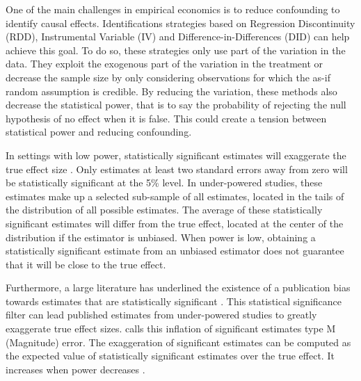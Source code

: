 \documentclass[12pt]{article}
\begin{document}



One of the main challenges in empirical economics is to reduce confounding to identify causal effects. Identifications strategies based on Regression Discontinuity (RDD), Instrumental Variable (IV) and Difference-in-Differences (DID) can help achieve this goal. To do so, these strategies only use part of the variation in the data. They exploit the exogenous part of the variation in the treatment or decrease the sample size by only considering observations for which the as-if random assumption is credible. By reducing the variation, these methods also decrease the statistical power, that is to say the probability of rejecting the null hypothesis of no effect when it is false. This could create a tension between statistical power and reducing
confounding.



In settings with low power, statistically significant estimates will exaggerate the true effect size \citep{ioannidis_why_2008, gelman_beyond_2014}. Only estimates at least two standard errors away from zero will be statistically significant at the 5\% level. In under-powered studies, these estimates make up a selected sub-sample of all estimates, located in the tails of the distribution of all possible estimates. The average of these statistically significant estimates will differ from the true effect, located at the center of the distribution if the estimator is unbiased. When power is low, obtaining a statistically significant estimate from an unbiased estimator does not guarantee that it will be close to the true effect. 

Furthermore, a large literature has underlined the existence of a publication bias towards estimates that are statistically significant \citep[for instance]{rosenthal_file_1979, andrews_identification_2019, abadie_statistical_2020, brodeur_methods_2020}. This statistical significance filter can lead published estimates from under-powered studies to greatly exaggerate true effect sizes. \cite{gelman_beyond_2014} calls this inflation of significant estimates type M (Magnitude) error. The exaggeration of significant estimates can be computed as the expected value of statistically significant estimates over the true effect. It increases when power decreases \citep{lu_note_2019, zwet_significance_2021}.
    
\end{document}
